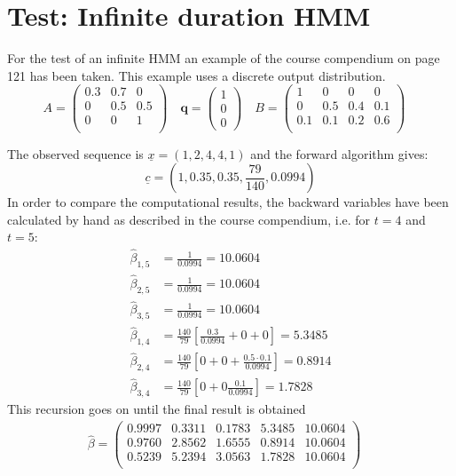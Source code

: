\section{Test: Infinite duration HMM}
For the test of an infinite HMM an example of the course compendium on page 121 has been taken. This example uses a discrete output distribution.
$$
A = 
 \begin{pmatrix}
  0.3 & 0.7 & 0 \\
  0 & 0.5 & 0.5\\
  0 & 0 & 1\\
 \end{pmatrix} \quad
 \mathbf{q} = 
 \begin{pmatrix}
  1\\
  0\\
  0
 \end{pmatrix} 
 \quad
 B=
 \begin{pmatrix}
  1 & 0 & 0 & 0 \\
  0 & 0.5 & 0.4 & 0.1\\
  0.1 & 0.1& 0.2 &0.6\\
 \end{pmatrix} \quad
 $$
 
 The observed sequence is $\underline{x}=(1,2,4,4,1)$ and the forward algorithm gives: $$\underline{c} =(1,0.35,0.35,\frac{79}{140},0.0994)$$ In order to compare the computational results, the backward variables have been calculated by hand as described in the course compendium, i.e. for $t=4$ and $t=5$:
\begin{align*}
\hat{\beta}_{1,5}&=\frac{1}{0.0994}=10.0604\\
\hat{\beta}_{2,5}&=\frac{1}{0.0994}=10.0604\\
\hat{\beta}_{3,5}&=\frac{1}{0.0994}=10.0604\\
\hat{\beta}_{1,4}&=\frac{140}{79}[\frac{0.3}{0.0994}+0+0]=5.3485\\
\hat{\beta}_{2,4}&=\frac{140}{79}[0+0+\frac{0.5\cdot0.1}{0.0994}]=0.8914\\
\hat{\beta}_{3,4}&=\frac{140}{79}[0+0\frac{0.1}{0.0994}]=1.7828
\end{align*}
This recursion goes on until the final result is obtained
\begin{align*}
\hat{\beta} = 
 \begin{pmatrix}
  0.9997   & 0.3311 &   0.1783 &   5.3485 &  10.0604 \\
  0.9760 &   2.8562 &   1.6555 &   0.8914&   10.0604\\
  0.5239   & 5.2394 &   3.0563 &   1.7828 &  10.0604\\
 \end{pmatrix} \quad
\end{align*}

